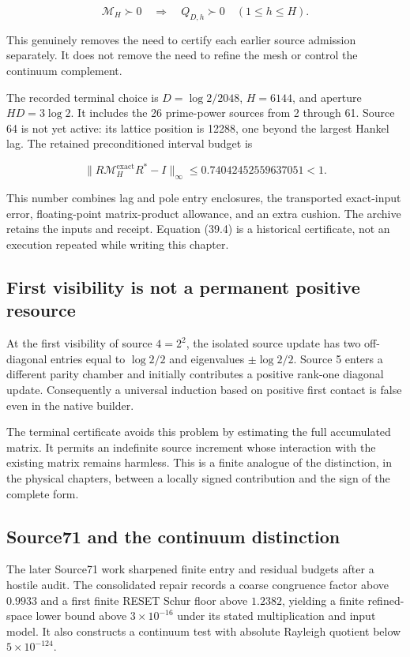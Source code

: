 \documentclass[
  10pt,
  a4paper,
  10pt,
  oneside,
  openany]{book}
\begin{document}
\[
 \mathcal M_H\succ0
 \quad\Longrightarrow\quad
 Q_{D,h}\succ0\quad(1\le h\le H).
 \tag{39.3}\label{eq:39.3}
\]

This genuinely removes the need to certify each earlier source admission
separately. It does not remove the need to refine the mesh or control
the continuum complement.

The recorded terminal choice is \(D=\log2/2048\), \(H=6144\), and
aperture \(HD=3\log2\). It includes the 26 prime-power sources from 2
through 61. Source 64 is not yet active: its lattice position is 12288,
one beyond the largest Hankel lag. The retained preconditioned interval
budget is

\[
 \|R\mathcal M_H^{\mathrm{exact}}R^{*}-I\|_\infty
 \le0.74042452559637051<1.
 \tag{39.4}\label{eq:39.4}
\]

This number combines lag and pole entry enclosures, the transported
exact-input error, floating-point matrix-product allowance, and an extra
cushion. The archive retains the inputs and receipt. Equation (39.4) is
a historical certificate, not an execution repeated while writing this
chapter.

\subsection{First visibility is not a permanent positive
resource}\label{first-visibility-is-not-a-permanent-positive-resource}

At the first visibility of source \(4=2^2\), the isolated source update
has two off-diagonal entries equal to \(\log2/2\) and eigenvalues
\(\pm\log2/2\). Source 5 enters a different parity chamber and initially
contributes a positive rank-one diagonal update. Consequently a
universal induction based on positive first contact is false even in the
native builder.

The terminal certificate avoids this problem by estimating the full
accumulated matrix. It permits an indefinite source increment whose
interaction with the existing matrix remains harmless. This is a finite
analogue of the distinction, in the physical chapters, between a locally
signed contribution and the sign of the complete form.

\subsection{Source71 and the continuum
distinction}\label{source71-and-the-continuum-distinction}

The later Source71 work sharpened finite entry and residual budgets
after a hostile audit. The consolidated repair records a coarse
congruence factor above \(0.9933\) and a first finite RESET Schur floor
above \(1.2382\), yielding a finite refined-space lower bound above
\(3\times10^{-16}\) under its stated multiplication and input model. It
also constructs a continuum test with absolute Rayleigh quotient below
\(5\times10^{-124}\).
\end{document}
